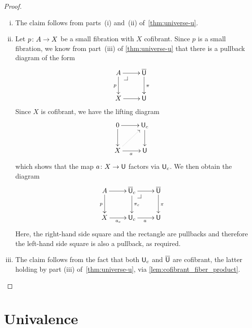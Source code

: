 \documentclass[reqno,10pt,a4paper,oneside,draft]{amsart}
\begin{document}
\begin{proof} \hfill
\begin{enumerate}[(i)] 
\item The claim follows from parts~(i) and~(ii) of~\cref{thm:universe-u}. 
\item Let $p \colon A \to X$ be a small fibration with $X$ cofibrant. Since $p$ is a
small fibration, we know 
from part~(iii) of \cref{thm:universe-u} that there is a pullback diagram of the form 
\[
\xymatrix{
A \ar[r] \ar[d]_p \drpullback & \UU \ar[d]^{\pi} \\
X \ar[r] & \U }
\]
Since $X$ is cofibrant, we have the lifting diagram
\[
\xymatrix{
0 \ar[r] \ar[d] & \U_c \ar[d]^{} \\
X \ar[r]_a \ar@{.>}[ur] & \U }
\]
which shows that the map $a \colon X \to \mathsf{U}$ factors via $\mathsf{U}_c$.  We then obtain the diagram
\[
\xymatrix{
A \ar[r] \ar[d]_p &  \UU_c \ar[r]  \ar[d]^{\pi_c} \drpullback & \UU \ar[d]^{\pi} \\
X \ar[r]_{a_c} & \U_c \ar[r]_{a} &  \U }
\]
Here, the right-hand side square and the rectangle are pullbacks and therefore the left-hand
side square is also a pullback, as required. 
\item The claim follows from the fact that both $\mathsf{U}_c$ and
$\overline{\mathsf{U}}$ are cofibrant, the latter holding by part (iii) of~\cref{thm:universe-u}, via \cref{lem:cofibrant_fiber_product}. \qedhere
\end{enumerate} 
\end{proof} 






\section{Univalence} 
\end{document}
